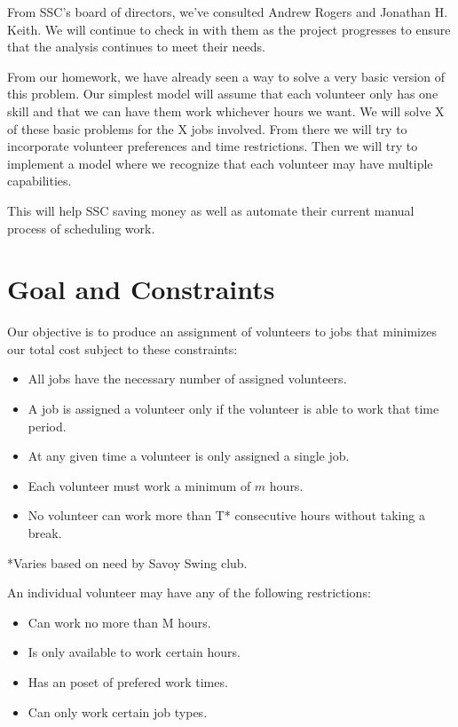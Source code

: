 \documentclass[12pt]{article}
\theoremstyle{definition}
\begin{document}
From SSC's board of directors, we've consulted Andrew Rogers and Jonathan H. Keith. We will continue to check in with them as the project progresses to ensure that the analysis continues to meet their needs. 

From our homework, we have already seen a way to solve a very basic version of this problem. Our simplest model will assume that each volunteer only has one skill and that we can have them work whichever hours we want. We will solve X of these basic problems for the X jobs involved. From there we will try to incorporate volunteer preferences and time restrictions. Then we will try to implement a model where we recognize that each volunteer may have multiple capabilities.

This will help SSC saving money as well as automate their current manual process of scheduling work. 

\section{Goal and Constraints}
\noindent Our objective is to produce an assignment of volunteers to jobs that minimizes our total cost subject to these constraints:
\begin{itemize} \itemsep1pt \parskip0pt 
\item All jobs have the necessary number of assigned volunteers.
\item A job is assigned a volunteer only if the volunteer is able to work that time period.
\item At any given time a volunteer is only assigned a single job.
\item Each volunteer must work a minimum of $m$ hours.
\item No volunteer can work more than T* consecutive hours without taking a break. 
\end{itemize}
*Varies based on need by Savoy Swing club.

\noindent An individual volunteer may have any of the following restrictions:
\begin{itemize} \itemsep1pt \parskip0pt 
\item Can work no more than M hours.
\item Is only available to work certain hours.
\item Has an poset of prefered work times.
\item Can only work certain job types.
\end{itemize}
\end{document}
